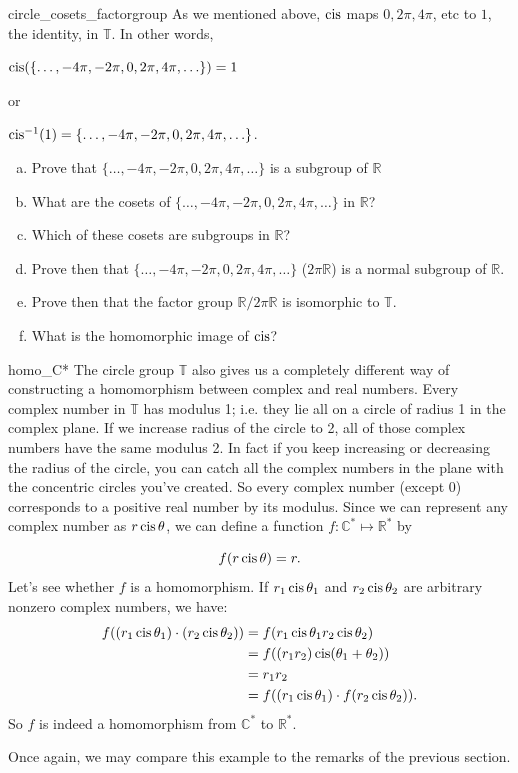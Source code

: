 \begin{exercise}{circle_cosets_factorgroup}
As we mentioned above, $\operatorname{cis}$ maps $0, 2\pi, 4\pi$, etc to $1$, the identity, in ${ \mathbb T}$. In other words,

$\operatorname{cis}(\{ \ldots , -4\pi, -2\pi, 0, 2\pi, 4\pi, \ldots \}) = 1$

\noindent
or 

$\operatorname{cis}^{-1}(1) = \{ \ldots , -4\pi, -2\pi, 0, 2\pi, 4\pi, \ldots \}$.

\begin{enumerate}[(a)]
\item
Prove that $\{ \ldots , -4\pi, -2\pi, 0, 2\pi, 4\pi, \ldots \}$ is a subgroup of ${ \mathbb R}$
\item
What are the cosets of $\{ \ldots , -4\pi, -2\pi, 0, 2\pi, 4\pi, \ldots \}$ in ${ \mathbb R}$?
\item
Which  of these cosets are subgroups in ${ \mathbb R}$?
\item
Prove then that $\{ \ldots , -4\pi, -2\pi, 0, 2\pi, 4\pi, \ldots \}$ ($2\pi { \mathbb R}$) is a normal subgroup of ${ \mathbb R}$.
\item
Prove then that the factor group ${ \mathbb R} / 2\pi { \mathbb R}$ is isomorphic to ${ \mathbb T}$.
\item
What is the homomorphic image of $\operatorname{cis}$?
\end{enumerate}
\end{exercise} 

\begin{example}{homo_C*}
The circle group ${ \mathbb T}$ also gives us a completely different way of constructing a homomorphism between complex and real numbers.  Every complex number in ${ \mathbb T}$ has modulus 1; i.e. they lie all on a circle of radius 1 in the complex plane.  If we increase radius of the circle to 2, all of those complex numbers have the same modulus 2.  In fact if you keep increasing or decreasing the radius of the circle, you can catch all the complex numbers in the plane with the concentric circles you've created.  So every complex number (except 0) corresponds to a positive real number by its modulus. Since we can represent any complex number as $r \operatorname{cis} \theta$, we can define a function
$f:  {\mathbb C}^\ast \mapsto  {\mathbb R}^\ast$ by

\[
f(r \operatorname{cis} \theta) = r.
\]
Let's see whether $f$ is a homomorphism. If $r_1 \operatorname{cis} \theta_1$ and $r_2 \operatorname{cis} \theta_2$ are arbitrary nonzero complex numbers, we have:
\begin{align*}
f((r_1\operatorname{cis} \theta_1)\cdot (r_2\operatorname{cis} \theta_2)) &= f(r_1 \operatorname{cis} \theta_1 r_2 \operatorname{cis} \theta_2)\\
&= f((r_1 r_2)\operatorname{cis} (\theta_1+ \theta_2))\\
&= r_1 r_2 \\
&= f((r_1\operatorname{cis} \theta_1)\cdot f(r_2\operatorname{cis} \theta_2)).
\end{align*}
So $f$ is indeed a homomorphism from ${\mathbb C}^\ast$ to ${\mathbb R}^\ast$.
\end{example}
Once again, we may compare this example to the remarks of the previous section.

